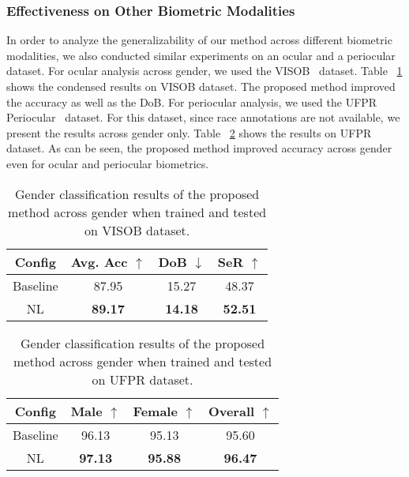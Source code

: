 \documentclass[runningheads]{llncs}
\begin{document}
\subsubsection{\textbf{Effectiveness on Other Biometric Modalities}} In order to analyze the generalizability of our method across different biometric modalities, we also conducted similar experiments on an ocular and a periocular dataset. For ocular analysis across gender, we used the VISOB~\cite{visob} dataset. Table ~\ref{tab:results_visob} shows the condensed results on VISOB dataset. The proposed method improved the accuracy as well as the DoB. For periocular analysis, we used the UFPR Periocular~\cite{ufpr} dataset. For this dataset, since race annotations are not available, we present the results across gender only. Table ~\ref{tab:results_ufpr} shows the results on UFPR dataset. As can be seen, the proposed method improved accuracy across gender even for ocular and periocular biometrics. 

\begin{table}[H]
    \centering
    \caption{Gender classification results of the proposed method across gender when trained and tested on VISOB dataset.}
    \label{tab:results_visob}
    \begin{tabular}{cccc} 
    \toprule
    \textbf{Config} & \textbf{Avg. Acc $\uparrow$} & \textbf{DoB $\downarrow$} & \textbf{SeR $\uparrow$} \\ \midrule
    Baseline &  87.95 & 15.27 & 48.37 \\
    NL & \textbf{89.17} & \textbf{14.18} & \textbf{52.51} \\
    \bottomrule
    \end{tabular}
\end{table}

\begin{table}[H]
    \centering
    \caption{Gender classification results of the proposed method across gender when trained and tested on UFPR dataset.}
    \label{tab:results_ufpr}
    \begin{tabular}{cccc} 
    \toprule
    \textbf{Config} & \textbf{Male $\uparrow$} & \textbf{Female $\uparrow$} & \textbf{Overall $\uparrow$} \\ \midrule
    Baseline & 96.13 & 95.13 & 95.60 \\
    NL & \textbf{97.13} & \textbf{95.88} & \textbf{96.47} \\
    \bottomrule
    \end{tabular}
\end{table}
\end{document}
